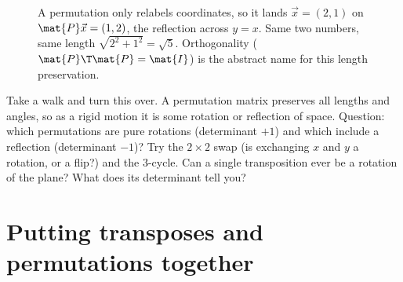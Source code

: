 \begin{figure}[H]
\centering
{}
\caption{A permutation only relabels coordinates, so it lands $\vec{x}=(2,1)$ on
$\mat{P}\vec{x}=(1,2)$, the reflection across $y=x$. Same two numbers, same length
$\sqrt{2^2+1^2}=\sqrt5$. Orthogonality ($\mat{P}\T\mat{P}=\mat{I}$) is the abstract name for this
length preservation.}
\label{ch10:fig-isometry}
\end{figure}

\begin{walkbox}
Take a walk and turn this over. A permutation matrix preserves all lengths and angles, so as a
rigid motion it is some rotation or reflection of space. Question: which permutations are pure
rotations (determinant $+1$) and which include a reflection (determinant $-1$)? Try the $2\times 2$
swap (is exchanging $x$ and $y$ a rotation, or a flip?) and the $3$-cycle. Can a single transposition
ever be a rotation of the plane? What does its determinant tell you?
\end{walkbox}

\section{Putting transposes and permutations together}

